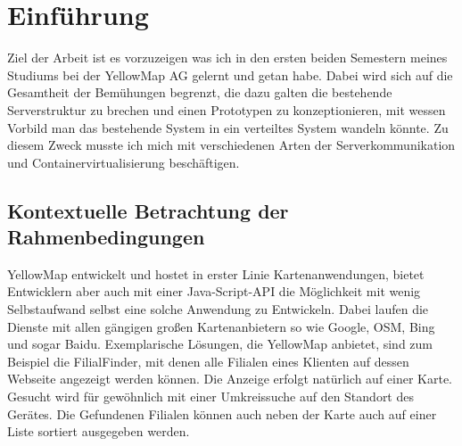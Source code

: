 \documentclass[12pt,a4paper]{scrartcl}
\begin{document}
\tableofcontents
{}
\newpage
\listoffigures
{}
\newpage
\listoftables
{}
\newpage
\printglossary
{}
\newpage


\section{Einf\"uhrung}
Ziel der Arbeit ist es vorzuzeigen was ich in den ersten beiden Semestern meines Studiums bei der YellowMap AG gelernt und getan habe. Dabei wird sich auf die Gesamtheit der Bemühungen begrenzt, die dazu galten die bestehende Serverstruktur zu brechen und einen Prototypen zu konzeptionieren, mit wessen Vorbild man das bestehende System in ein verteiltes System wandeln könnte. Zu diesem Zweck musste ich mich mit verschiedenen Arten der Serverkommunikation und Containervirtualisierung beschäftigen.

\subsection{Kontextuelle Betrachtung der Rahmenbedingungen}

YellowMap entwickelt und hostet in erster Linie Kartenanwendungen, bietet Entwicklern aber auch mit einer Java-Script-API die Möglichkeit mit wenig Selbstaufwand selbst eine solche Anwendung zu Entwickeln. Dabei laufen die Dienste mit allen gängigen großen Kartenanbietern so wie Google, OSM, Bing und sogar Baidu. Exemplarische Lösungen, die YellowMap anbietet, sind zum Beispiel die FilialFinder, mit denen alle Filialen eines Klienten auf dessen Webseite angezeigt werden können. Die Anzeige erfolgt natürlich auf einer Karte. Gesucht wird für gewöhnlich mit einer Umkreissuche auf den Standort des Gerätes. Die Gefundenen Filialen können auch neben der Karte auch auf einer Liste sortiert ausgegeben werden.
\end{document}
